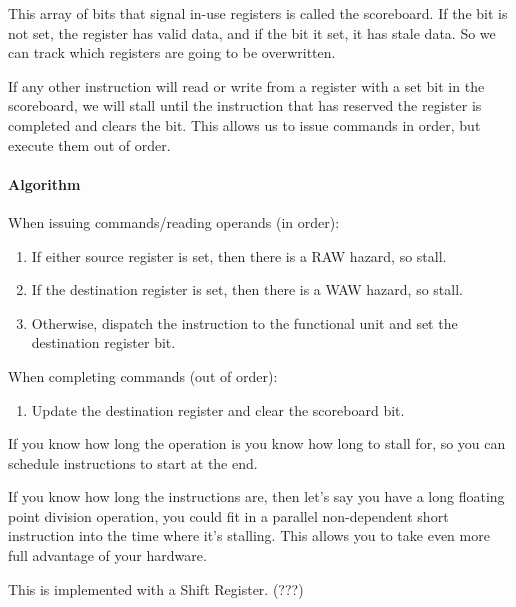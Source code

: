 \documentclass{article}
\begin{document}
This array of bits that signal in-use registers is called the scoreboard. If the bit is not set, the register has valid data, and if the bit it set, it has stale data. So we can track which registers are going to be overwritten. 

If any other instruction will read or write from a register with a set bit in the scoreboard, we will stall until the instruction that has reserved the register is completed and clears the bit. This allows us to issue commands in order, but execute them out of order.

\paragraph{Algorithm}

When issuing commands/reading operands (in order):

\begin{enumerate}

\item If either source register is set, then there is a RAW hazard, so stall.

\item If the destination register is set, then there is a WAW hazard, so stall.

\item Otherwise, dispatch the instruction to the functional unit and set the destination register bit. 

\end{enumerate}

\noindent When completing commands (out of order):

\begin{enumerate}
\item Update the destination register and clear the scoreboard bit.

\end{enumerate}


If you know how long the operation is you know how long to stall for, so you can schedule instructions to start at the end. 

If you know how long the instructions are, then let's say you have a long floating point division operation, you could fit in a parallel non-dependent short instruction into the time where it's stalling. This allows you to take even more full advantage of your hardware.

This is implemented with a Shift Register. (???)
\end{document}
